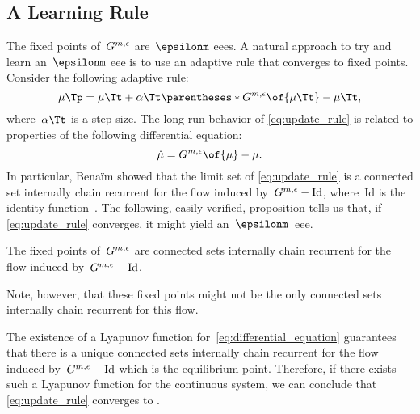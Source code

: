 \subsection{A Learning Rule}

The fixed points of~\(G^{m, \epsilon}\) are~\(\epsilonm\) \acp{eee}.
A natural approach to try and learn an~\(\epsilonm\) \ac{eee} is to use an adaptive rule that converges to fixed points.
Consider the following adaptive rule:
\begin{equation}
\label{eq:update_rule}
\mu\Tp = \mu\Tt + \alpha\Tt \parentheses*{\GGe \of{\mu\Tt} - \mu\Tt},
\end{equation}
where~\(\alpha\Tt\) is a step size.
The long-run behavior of \cref{eq:update_rule} is related to properties of the following differential equation:
\begin{equation}
\label{eq:differential_equation}
\dot{\mu} = \GGe \of{\mu} - \mu.
\end{equation}
In particular, Benaïm showed that the limit set of \cref{eq:update_rule} is a connected set internally chain recurrent for the flow induced by~\(G^{m, \epsilon} - \mathrm{Id}\), where~\(\mathrm{Id}\) is the identity function~\cite{benaim:1996}.
The following, easily verified, proposition tells us that, if \cref{eq:update_rule} converges, it might yield an~\(\epsilonm\)~\ac{eee}.

\begin{proposition}
The fixed points of~\(G^{m, \epsilon}\) are connected sets internally chain recurrent for the flow induced by~\(G^{m, \epsilon} - \mathrm{Id}\).
\end{proposition}

Note, however, that these fixed points might not be the only connected sets internally chain recurrent for this flow.

The existence of a Lyapunov function for~\cref{eq:differential_equation} guarantees that there is a unique connected sets internally chain recurrent for the flow induced by~\(G^{m, \epsilon} - \mathrm{Id}\) which is the equilibrium point.
Therefore, if there exists such a Lyapunov function for the continuous system, we can conclude that \cref{eq:update_rule} converges to .

